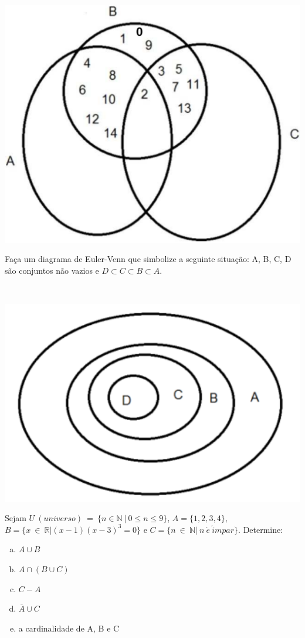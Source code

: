 \documentclass[a4paper, 12pt, addpoints]{exam}
\begin{document}
\begin{questions}
\begin{resp}~

    \begin{center}
        \includegraphics[width=.4\linewidth]{Figs/conjuntos-cropped.pdf}
    \end{center}
    
\end{resp}


\question Faça um diagrama de Euler-Venn que simbolize a seguinte situação: A, B, C, D são conjuntos não vazios e $D \subset C \subset B \subset A$.

\begin{resp}~
    
    \begin{center}
        \includegraphics[width=.4\linewidth]{Figs/conjuntos2.png}
    \end{center}
\end{resp}

\question Sejam $U ~ (universo) ~ = ~ \{n \in \mathbb{N} ~ | ~ 0 \leq n \leq 9\}$, $A = \{1, 2, 3, 4\}$, $B = \{x ~ \in ~ \mathbb{R} | (x - 1) (x - 3)^3 = 0\}$ e $C = \{n ~ \in ~ \mathbb{N} | ~ n ~ \acute{e} ~ \acute{i}mpar \}$. Determine:
\begin{enumerate}[a)]
    \item $A \cup B$
    \item $A \cap (B \cup C)$
    \item $C - A$
    \item $ \overline{A} \cup C$
    \item a cardinalidade de A, B e C
\end{enumerate}

\begin{resp}~


\end{resp}
\end{questions}
\end{document}
